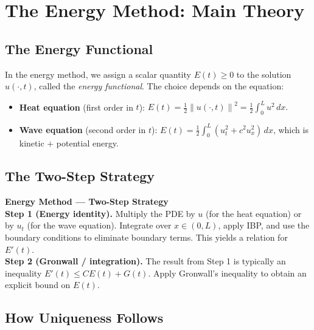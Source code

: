 \documentclass[12pt,a4paper]{article}
\theoremstyle{plain}
\theoremstyle{definition}
\newcommand{\norm}[1]{\left\lVert #1 \right\rVert}
\begin{document}
\section{The Energy Method: Main Theory}
\label{sec:theory}

\subsection{The Energy Functional}

In the energy method, we assign a scalar quantity $E(t)\geq 0$ to the solution
$u(\cdot,t)$, called the \emph{energy functional}. The choice depends on the
equation:
\begin{itemize}
  \item \textbf{Heat equation} (first order in $t$):
        $\displaystyle E(t) = \tfrac{1}{2}\norm{u(\cdot,t)}^2
                             = \tfrac{1}{2}\int_0^L u^2\,dx.$
  \item \textbf{Wave equation} (second order in $t$):
        $\displaystyle E(t) = \tfrac{1}{2}\int_0^L (u_t^2 + c^2 u_x^2)\,dx$,
        which is kinetic $+$ potential energy.
\end{itemize}

\subsection{The Two-Step Strategy}

\begin{mdframed}[style=keybox]
\textbf{Energy Method — Two-Step Strategy}\\[4pt]
\textbf{Step 1 (Energy identity).}
Multiply the PDE by $u$ (for the heat equation) or by $u_t$ (for the wave
equation). Integrate over $x\in(0,L)$, apply IBP, and use the boundary
conditions to eliminate boundary terms. This yields a relation for $E'(t)$.\\[4pt]
\textbf{Step 2 (Gronwall / integration).}
The result from Step 1 is typically an inequality $E'(t)\leq CE(t)+G(t)$.
Apply Gronwall's inequality to obtain an explicit bound on $E(t)$.
\end{mdframed}

\subsection{How Uniqueness Follows}
\end{document}
